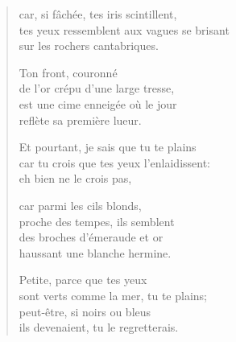 \begin{verse}
  car, si fâchée,
  tes iris scintillent, \\
  tes yeux ressemblent
  aux vagues se brisant \\
  sur les rochers cantabriques.

  Ton front, couronné \\
  de l'or crépu d'une large tresse, \\
  est une cime enneigée où le jour \\
  reflète sa première lueur.

  Et pourtant,
  je sais que tu te plains \\
  car tu crois que tes yeux
  l'enlaidissent: \\
  eh bien ne le crois pas,

  car parmi les cils blonds, \\
  proche des tempes, ils semblent \\
  des broches d'émeraude et or \\
  haussant une blanche hermine.

  Petite, parce que tes yeux \\
  sont verts comme la mer, tu te plains; \\
  peut-être, si noirs ou bleus \\
  ils devenaient, tu le regretterais.
\end{verse}
